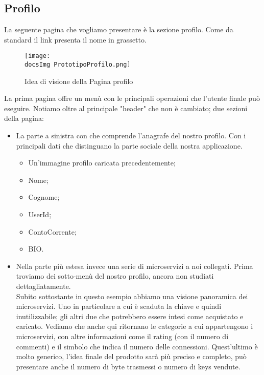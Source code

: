 {	\subsection{Profilo}{
		La seguente pagina che vogliamo presentare è la sezione profilo. Come da standard il link presenta il nome in grassetto.\\
		\begin{figure}[H]
			\centering
			\texttt{[image: \\docsImg PrototipoProfilo.png]}
			\caption{Idea di visione della Pagina profilo}
			\label{PrototipoProfilo}
		\end{figure}
		La prima pagina offre un menù con le principali operazioni che l'utente finale può eseguire. Notiamo oltre al principale "header" che non è cambiato; due sezioni della pagina:
		\begin{itemize}
			\item La parte a sinistra con che comprende l'anagrafe del nostro profilo. Con i principali dati che distinguano la parte sociale della nostra applicazione. 
			\begin{itemize}
				\item Un'immagine profilo caricata precedentemente;
				\item Nome;
				\item Cognome;
				\item UserId;
				\item ContoCorrente;
				\item BIO.
			\end{itemize}
			\item Nella parte più estesa invece una serie di microservizi a noi collegati. Prima troviamo dei sotto-menù del nostro profilo, ancora non studiati dettagliatamente.\\
			Subito sottostante in questo esempio abbiamo una visione panoramica dei microservizi. Uno in particolare a cui è scaduta la chiave e quindi inutilizzabile; gli altri due che potrebbero essere intesi come acquistato e caricato. Vediamo che anche qui ritornano le categorie a cui appartengono i microservizi, con altre informazioni come il rating (con il numero di commenti) e il simbolo che indica il numero delle connessioni. Quest'ultimo è molto generico, l'idea finale del prodotto sarà più preciso e completo, può presentare anche il numero di byte trasmessi o numero di keys vendute. 
		\end{itemize}	
	}	
	
}
